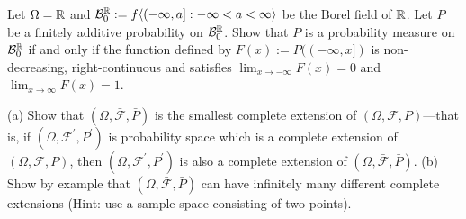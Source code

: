 %
\begin{exercise}
Let $\Omega = \Bbb R$ and $\mathcal B_0^{\Bbb R}:= f\langle (-\infty,a]: -\infty < a <\infty  \rangle$ be the Borel field of $\Bbb R$. Let $P$ be a finitely additive probability on $\mathcal B_0^{\Bbb R}$. Show that $P$ is a probability measure on  $\mathcal B_0^{\Bbb R}$ if and only if the function defined by $F(x):= P((-\infty, x])$ is non-decreasing, right-continuous and satisfies $\lim_{x\rightarrow -\infty} F(x)=0$ and  $\lim_{x\rightarrow \infty} F(x)=1$.
\end{exercise}
%



\begin{exercise}
(a) Show that $(\Omega, \bar{\mathcal F}, \bar P)$ is the smallest complete extension of $(\Omega, \mathcal F, P)$---that is, if $(\Omega, \mathcal F^\prime, P^\prime)$ is probability space which is a complete extension of $(\Omega, \mathcal F, P)$, then $(\Omega, \mathcal F^\prime, P^\prime)$ is also a complete extension of $(\Omega, \bar{\mathcal F}, \bar P)$. (b) Show by example that $(\Omega, \bar{\mathcal F}, \bar P)$ can have infinitely many different complete extensions (Hint: use a sample space consisting of two points).
\end{exercise}


